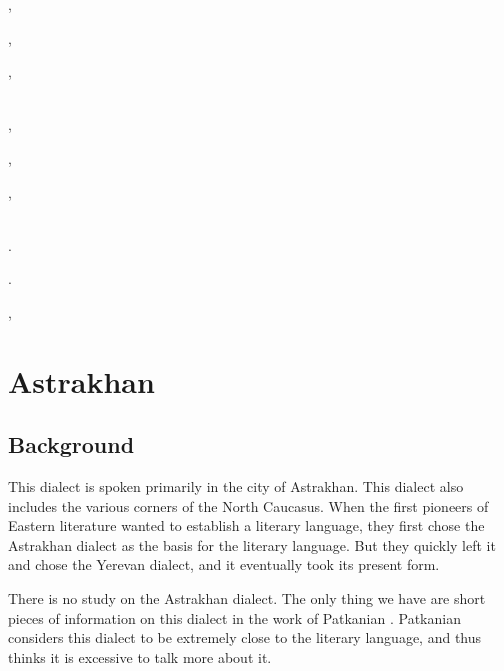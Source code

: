 ,

,

,


~\\

,

,

,



~\\

.

.

,







\chapter{Astrakhan}\label{chapter:Astrakhan}

\section{Background}

\begin{adjarianpage}\label{page:82}\end{adjarianpage}%

This dialect is spoken primarily in the city of Astrakhan. This dialect also includes the various corners of the North Caucasus. When the first pioneers of Eastern literature wanted  to establish a literary language, they first chose the Astrakhan dialect as the basis for the literary language. But they quickly left it and chose the Yerevan dialect, and it eventually took its present form. 

There is no study on the Astrakhan dialect. The only thing we have are short pieces of information on this dialect in the work of Patkanian \citep[24]{Patkanian-1869-RussianDialects}. Patkanian considers this dialect to be extremely close to the literary language, and thus thinks it is excessive to talk more about it. 

